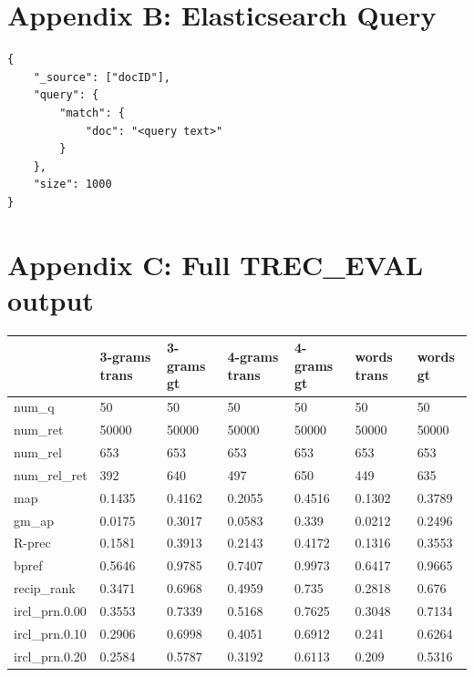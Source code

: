 \documentclass[jair, twoside,11pt,theapa]{article}
\begin{document}
\pagebreak

\section*{Appendix B: Elasticsearch Query}
\label{Appendix B}
\begin{verbatim}
{
    "_source": ["docID"],
    "query": {
        "match": {
            "doc": "<query text>"
        }
    },
    "size": 1000
}
\end{verbatim}

\pagebreak
\section*{Appendix C: Full TREC\_EVAL output} 
\begin{table}[h!]
\begin{tabular}{|l|l|l|l|l|l|l|}
\hline
               & 3-grams trans & 3-grams gt & 4-grams trans & 4-grams gt & words trans & words gt \\ \hline
num\_q         & 50        & 50       & 50        & 50        & 50        & 50       \\ \hline
num\_ret       & 50000     & 50000    & 50000     & 50000     & 50000     & 50000    \\ \hline
num\_rel       & 653       & 653      & 653       & 653       & 653       & 653      \\ \hline
num\_rel\_ret  & 392       & 640      & 497       & 650       & 449       & 635      \\ \hline
map            & 0.1435    & 0.4162   & 0.2055    & 0.4516    & 0.1302    & 0.3789   \\ \hline
gm\_ap         & 0.0175    & 0.3017   & 0.0583    & 0.339     & 0.0212    & 0.2496   \\ \hline
R-prec         & 0.1581    & 0.3913   & 0.2143    & 0.4172    & 0.1316    & 0.3553   \\ \hline
bpref          & 0.5646    & 0.9785   & 0.7407    & 0.9973    & 0.6417    & 0.9665   \\ \hline
recip\_rank    & 0.3471    & 0.6968   & 0.4959    & 0.735     & 0.2818    & 0.676    \\ \hline
ircl\_prn.0.00 & 0.3553    & 0.7339   & 0.5168    & 0.7625    & 0.3048    & 0.7134   \\ \hline
ircl\_prn.0.10 & 0.2906    & 0.6998   & 0.4051    & 0.6912    & 0.241     & 0.6264   \\ \hline
ircl\_prn.0.20 & 0.2584    & 0.5787   & 0.3192    & 0.6113    & 0.209     & 0.5316   \\ \hline

\end{tabular}
\end{table}
\end{document}
